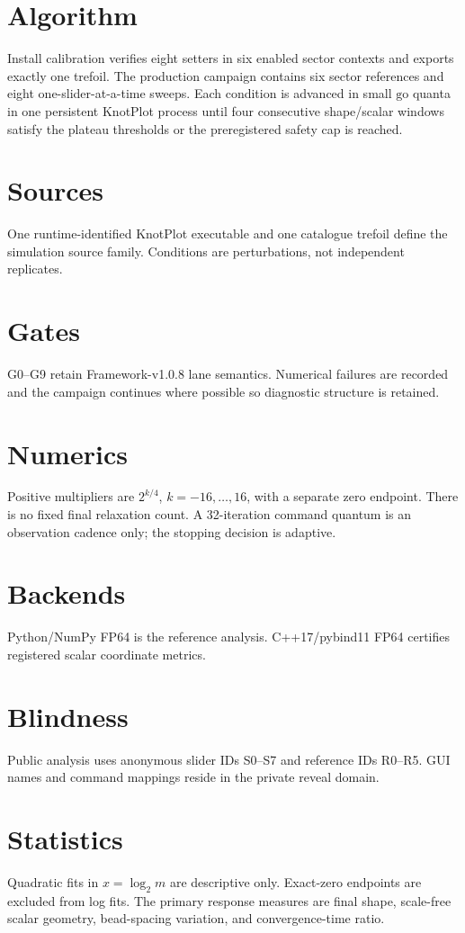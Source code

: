 \documentclass[11pt,a4paper]{article}
\begin{document}
\section{Algorithm}
Install calibration verifies eight setters in six enabled sector contexts and exports exactly one trefoil. The production campaign contains six sector references and eight one-slider-at-a-time sweeps. Each condition is advanced in small $\mathrm{go}$ quanta in one persistent KnotPlot process until four consecutive shape/scalar windows satisfy the plateau thresholds or the preregistered safety cap is reached.
\section{Sources}
One runtime-identified KnotPlot executable and one catalogue trefoil define the simulation source family. Conditions are perturbations, not independent replicates.
\section{Gates}
G0--G9 retain Framework-v1.0.8 lane semantics. Numerical failures are recorded and the campaign continues where possible so diagnostic structure is retained.
\section{Numerics}
Positive multipliers are $2^{k/4}$, $k=-16,\ldots,16$, with a separate zero endpoint. There is no fixed final relaxation count. A 32-iteration command quantum is an observation cadence only; the stopping decision is adaptive.
\section{Backends}
Python/NumPy FP64 is the reference analysis. C++17/pybind11 FP64 certifies registered scalar coordinate metrics.
\section{Blindness}
Public analysis uses anonymous slider IDs S0--S7 and reference IDs R0--R5. GUI names and command mappings reside in the private reveal domain.
\section{Statistics}
Quadratic fits in $x=\log_2m$ are descriptive only. Exact-zero endpoints are excluded from log fits. The primary response measures are final shape, scale-free scalar geometry, bead-spacing variation, and convergence-time ratio.
\end{document}
